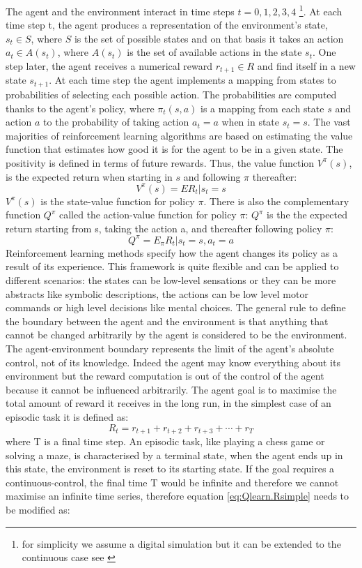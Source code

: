 The agent and the environment interact in time steps $t=0,1,2,3,4$
\footnote{for simplicity we assume a digital simulation but it can be extended
to the continuous case see \citep{TDrealtime}}.
At each time step t, the agent produces a representation of the environment's state,
$s_t \in S$, where  $S$
is the set of possible states and on that basis it takes an action $a_t \in A(s_t)$,
where $A(s_t)$ is the set of available actions in the state $s_t$.
One step later, the agent receives a numerical reward $r_{t+1}\in R$ and
find itself in a new state $s_{t+1}$.
At each time step the agent implements a mapping from states to probabilities
of selecting each possible action. The probabilities are
computed thanks to the agent's policy, where $\pi_t(s,a)$ is a mapping from
each state $s$ and action $a$ to the probability
of taking action  $a_t=a$ when in state $s_t=s$.
The vast majorities of reinforcement learning algorithms are based on estimating
the value function that estimates
how good it is for the agent to be in a given state. The positivity is defined in
terms of future rewards.
Thus, the value function $V^{\pi}(s)$, is the expected return when starting in
$s$ and following $\pi$ thereafter:
\begin{equation}
 V^\pi(s)=E{R_t|s_t=s}
\end{equation}
$V^{\pi}(s)$ is the state-value function for policy $\pi$.
There is also the complementary function $Q^\pi$ called the action-value function
for policy $\pi$: $Q^\pi$ is the the expected
 return starting from s, taking the action a, and thereafter following policy $\pi$:
\begin{equation}
 Q^\pi=E_\pi{R_t|s_t=s,a_t=a}
\end{equation}
Reinforcement learning methods specify how the agent changes its policy
as a result of its experience.
This framework is quite flexible and can be applied to different scenarios:
the states can be low-level sensations or they can be more
 abstracts like symbolic descriptions, the actions can be low level motor
commands or high level decisions like mental choices.
The general rule to define the boundary between the agent and the environment
is that anything that cannot be changed arbitrarily
by the agent is considered to be the environment.
The agent-environment boundary represents the limit of the agent's absolute control,
not of its knowledge. Indeed the agent may know
everything about its environment but the reward computation is out of the control
of the agent because it cannot be influenced arbitrarily.
The agent goal is to maximise the total amount of reward it receives in
the long run, in the simplest case of an
episodic task it is defined as:
\begin{equation}
 R_t=r_{t+1}+r_{t+2}+r_{t+3}+\cdots +r_T \label{eq:Qlearn.Rsimple}
\end{equation}
where T is a final time step. An episodic task, like playing a chess game
or solving a maze, is characterised by a terminal state, when
the agent ends up in this state, the environment is reset to its starting state.
If the goal requires a continuous-control, the final time T would be infinite and
therefore we cannot maximise an infinite time series,
therefore equation \ref{eq:Qlearn.Rsimple} needs to be modified as:

